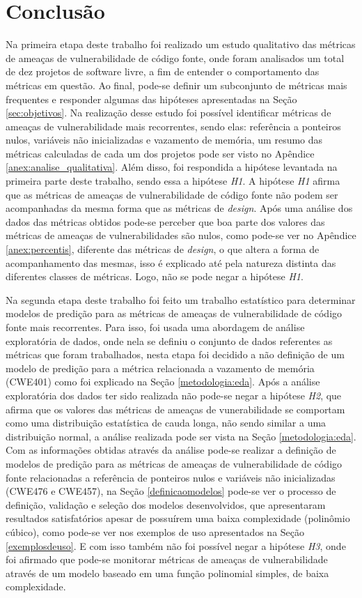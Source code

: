 \chapter{Conclusão} \label{chap:conclusao}

Na primeira etapa deste trabalho foi realizado um estudo qualitativo das
métricas de ameaças de vulnerabilidade de código fonte, onde foram analisados um
total de dez projetos de software livre, a fim de entender o comportamento das
métricas em questão. Ao final, pode-se definir um subconjunto de métricas mais
frequentes e responder algumas das hipóteses apresentadas na Seção
\ref{sec:objetivos}. Na realização desse estudo foi possível identificar
métricas de ameaças de vulnerabilidade mais recorrentes, sendo elas: referência
a ponteiros nulos, variáveis não inicializadas e vazamento de memória, um resumo
das métricas calculadas de cada um dos projetos pode ser visto no Apêndice
\ref{anex:analise_qualitativa}. Além disso, foi respondida a hipótese levantada
na primeira parte deste trabalho, sendo essa a hipótese \textit{H1}. A hipótese
\textit{H1} afirma que as métricas de ameaças de vulnerabilidade de código fonte
não podem ser acompanhadas da mesma forma que as métricas de \textit{design}.
Após uma análise dos dados das métricas obtidos pode-se perceber que boa parte
dos valores das métricas de ameaças de vulnerabilidades são nulos, como pode-se
ver no Apêndice \ref{anex:percentis}, diferente das métricas de \textit{design},
o que altera a forma de acompanhamento das mesmas, isso é explicado até pela
natureza distinta das diferentes classes de métricas. Logo, não se pode negar a
hipótese \textit{H1}.

Na segunda etapa deste trabalho foi feito um trabalho estatístico para
determinar modelos de predição para as métricas de ameaças de vulnerabilidade de
código fonte mais recorrentes. Para isso, foi usada uma abordagem de análise
exploratória de dados, onde nela se definiu o conjunto de dados referentes as
métricas que foram trabalhados, nesta etapa foi decidido a não definição de um
modelo de predição para a métrica relacionada a vazamento de memória (CWE401)
como foi explicado na Seção \ref{metodologia:eda}. Após a análise exploratória
dos dados ter sido realizada não pode-se negar a hipótese \textit{H2}, que
afirma que os valores das métricas de ameaças de vunerabilidade se comportam
como uma distribuição estatística de cauda longa, não sendo similar a uma
distribuição normal, a análise realizada pode ser vista na Seção
\ref{metodologia:eda}. Com as informações obtidas através da análise pode-se
realizar a definição de modelos de predição para as métricas de ameaças de
vulnerabilidade de código fonte relacionadas a referência de ponteiros nulos e
variáveis não inicializadas (CWE476 e CWE457), na Seção \ref{definicaomodelos}
pode-se ver o processo de definição, validação e seleção dos modelos
desenvolvidos, que apresentaram resultados satisfatórios apesar de possuírem uma
baixa complexidade (polinômio cúbico), como pode-se ver nos exemplos de uso
apresentados na Seção \ref{exemplosdeuso}. E com isso também não foi possível
negar a hipótese \textit{H3}, onde foi afirmado que pode-se monitorar métricas
de ameaças de vulnerabilidade através de um modelo baseado em uma função
polinomial simples, de baixa complexidade.

